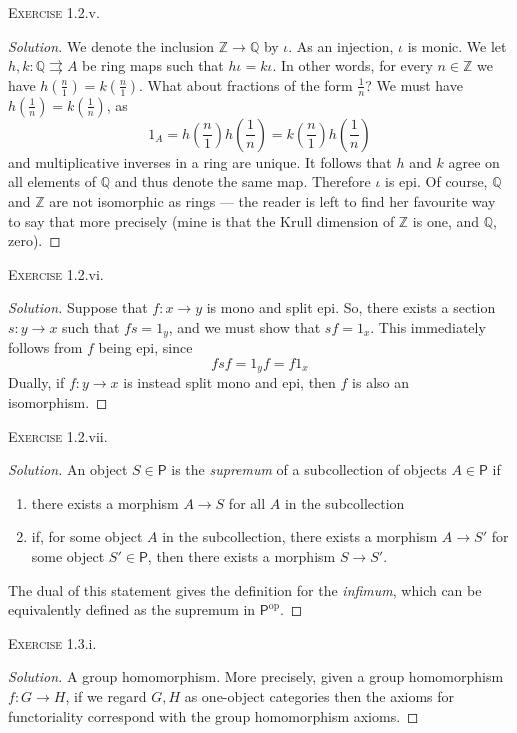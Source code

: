 \documentclass{article}
\newcommand{\Z}{\mathbb{Z}}
\newcommand{\Q}{\mathbb{Q}}
\newcommand{\cat}[1]{\textsf{#1}}
\newenvironment{solution}{\begin{proof}[Solution]}{\end{proof}}
\begin{document}
\noindent \textsc{Exercise} 1.2.v. 
\begin{solution}
    We denote the inclusion $\Z \to \Q$ by $\iota$. As an injection, $\iota$ is monic. We let $h,k: \Q \rightrightarrows A$ be ring maps such that $h \iota = k \iota$. In other words, for every $n \in \Z$ we have $h(\frac{n}{1}) = k(\frac{n}{1})$. What about fractions of the form $\frac{1}{n}$? We must have $h(\frac{1}{n}) = k(\frac{1}{n})$, as
    \[
    1_A = h(\frac{n}{1})h(\frac{1}{n}) = k(\frac{n}{1})h(\frac{1}{n})
    \]
    and multiplicative inverses in a ring are unique. It follows that $h$ and $k$ agree on all elements of $\Q$ and thus denote the same map. Therefore $\iota$ is epi. Of course, $\Q$ and $\Z$ are not isomorphic as rings --- the reader is left to find her favourite way to say that more precisely (mine is that the Krull dimension of $\Z$ is one, and $\Q$, zero).
\end{solution}
\noindent \textsc{Exercise} 1.2.vi. 
\begin{solution}
    Suppose that $f: x \to y$ is mono and split epi. So, there exists a section $s: y \to x$ such that $fs = 1_y$, and we must show that $sf = 1_x$. This immediately follows from $f$ being epi, since 
    \[
    fsf = 1_y f = f 1_x 
    \]
    Dually, if $f: y \to x$ is instead split mono and epi, then $f$ is also an isomorphism.
\end{solution}
\noindent \textsc{Exercise} 1.2.vii. \begin{solution}
An object $S \in \cat{P}$ is the \textit{supremum} of a subcollection of objects $A \in \cat{P}$ if 
\begin{enumerate}
\item there exists a morphism $A \to S$ for all $A$ in the subcollection 
\item if, for some object $A$ in the subcollection, there exists a morphism $A \to S'$ for some object $S' \in \cat{P}$, then there exists a morphism $S \to S'$. 
\end{enumerate}
The dual of this statement gives the definition for the \textit{infimum}, which can be equivalently defined as the supremum in $\cat{P}^{\text{op}}$.
\end{solution}
\noindent \textsc{Exercise} 1.3.i. \begin{solution}
    A group homomorphism. More precisely, given a group homomorphism $f: G 
    \to H$, if we regard $G, H$ as one-object categories then the axioms for functoriality correspond with the group homomorphism axioms. 
\end{solution}
\end{document}
